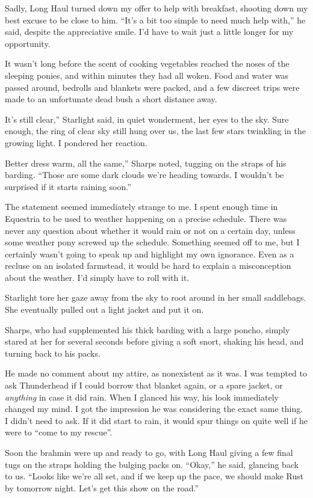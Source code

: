 Sadly, Long Haul turned down my offer to help with breakfast, shooting down my best excuse to be close to him. “It’s a bit too simple to need much help with,” he said, despite the appreciative smile. I’d have to wait just a little longer for my opportunity.

It wasn’t long before the scent of cooking vegetables reached the noses of the sleeping ponies, and within minutes they had all woken. Food and water was passed around, bedrolls and blankets were packed, and a few discreet trips were made to an unfortunate dead bush a short distance away.

\leavevmode{}It’s still clear,” Starlight said, in quiet wonderment, her eyes to the sky. Sure enough, the ring of clear sky still hung over us, the last few stars twinkling in the growing light. I pondered her reaction.

\leavevmode{}Better dress warm, all the same,” Sharps noted, tugging on the straps of his barding. “Those are some dark clouds we’re heading towards. I wouldn’t be surprised if it starts raining soon.”

The statement seemed immediately strange to me. I spent enough time in Equestria to be used to weather happening on a precise schedule. There was never any question about whether it would rain or not on a certain day, unless some weather pony screwed up the schedule. Something seemed off to me, but I certainly wasn’t going to speak up and highlight my own ignorance. Even as a recluse on an isolated farmstead, it would be hard to explain a misconception about the weather. I’d simply have to roll with it.

Starlight tore her gaze away from the sky to root around in her small saddlebags. She eventually pulled out a light jacket and put it on.

Sharps, who had supplemented his thick barding with a large poncho, simply stared at her for several seconds before giving a soft snort, shaking his head, and turning back to his packs.

He made no comment about my attire, as nonexistent as it was. I was tempted to ask Thunderhead if I could borrow that blanket again, or a spare jacket, or \textit{anything} in case it did rain. When I glanced his way, his look immediately changed my mind. I got the impression he was considering the exact same thing. I didn’t need to ask. If it did start to rain, it would spur things on quite well if he were to “come to my rescue”.

Soon the brahmin were up and ready to go, with Long Haul giving a few final tugs on the straps holding the bulging packs on. “Okay,” he said, glancing back to us. “Looks like we’re all set, and if we keep up the pace, we should make Rust by tomorrow night. Let’s get this show on the road.”


